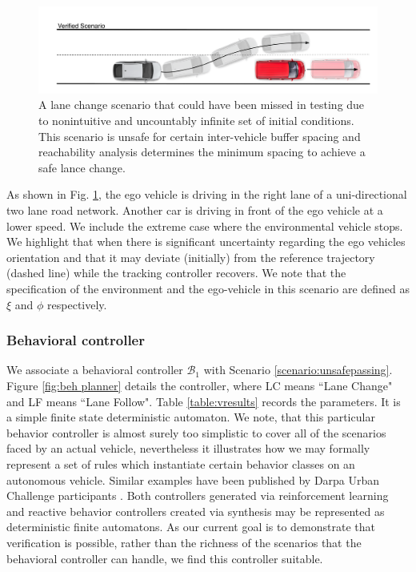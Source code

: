 \begin{figure}[b]
	\vspace{-10pt}
	\includegraphics[width=\columnwidth]{figures/safe_scenario}
	\caption{A lane change scenario that could have been missed in testing due to nonintuitive and uncountably infinite set of initial conditions. This scenario is unsafe for certain inter-vehicle buffer spacing and reachability analysis determines the minimum spacing to achieve a safe lance change.}
	\label{fig:danger}
\end{figure}
\vspace{10pt}
\begin{scenario}
	\label{scenario:unsafepassing}
	As shown in Fig. \ref{fig:danger}, the ego vehicle is driving in the right lane of a uni-directional two lane road network. 
	Another car is driving in front of the ego vehicle at a lower speed. We include the extreme case where the environmental vehicle stops.
	We highlight that when there is significant uncertainty regarding the ego vehicles orientation and that it may deviate (initially) from the reference trajectory (dashed line) while the tracking controller recovers. We note that the specification of the environment and the ego-vehicle in this scenario are defined as $\xi$ and $\phi$ respectively. \\
\end{scenario}

\subsubsection{Behavioral controller}
We associate a behavioral controller  $\mathcal{B}_1$ with Scenario \ref{scenario:unsafepassing}. 
Figure \ref{fig:beh planner} details the controller, where LC means ``Lane Change" and LF means ``Lane Follow".
Table \ref{table:vresults} records the parameters. It is a simple finite state deterministic automaton. We note, that this particular behavior controller is almost surely too simplistic to cover all of the scenarios faced by an actual vehicle, nevertheless it illustrates how we may formally represent a set of rules which instantiate certain behavior classes on an autonomous vehicle. Similar examples have been published by Darpa Urban Challenge participants \cite{}. Both controllers generated via reinforcement learning and reactive behavior controllers created via synthesis may be represented as deterministic finite automatons. As our current goal is to demonstrate that verification is possible, rather than the richness of the scenarios that the behavioral controller can handle, we find this controller suitable. 

